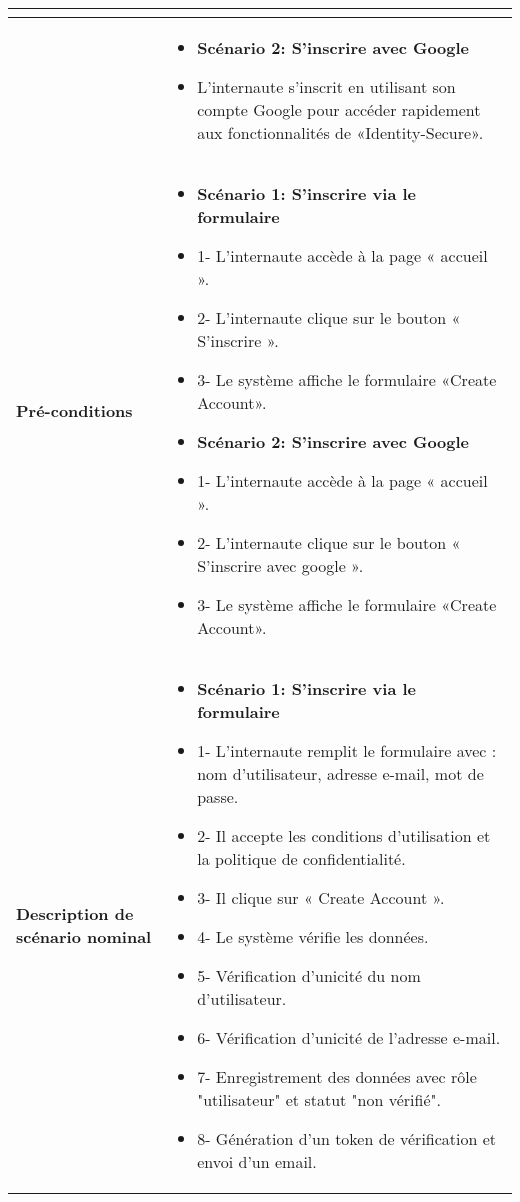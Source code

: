 \begin{longtable}{|>{\arraybackslash}p{4.2cm}|>{\arraybackslash}p{12.5cm}|}
\begin{itemize}[label=]
\end{itemize} \\
\hline
\textbf{} &
\begin{itemize}[label=]
    \item \textbf{Scénario 2: S'inscrire avec Google}
    \item L'internaute s'inscrit en utilisant son compte Google pour accéder rapidement aux fonctionnalités de «Identity-Secure».
\end{itemize}\\
\hline
\textbf{Pré-conditions} &
\begin{itemize}[label=]
    \item \textbf{Scénario 1: S'inscrire via le formulaire}
    \item 1- L'internaute accède à la page « accueil ».
    \item 2- L'internaute clique sur le bouton « S'inscrire ».
    \item 3- Le système affiche le formulaire «Create Account».
    \item \textbf{Scénario 2: S'inscrire avec Google}
    \item 1- L'internaute accède à la page « accueil ».
    \item 2- L'internaute clique sur le bouton « S'inscrire avec google ».
    \item 3- Le système affiche le formulaire «Create Account».
\end{itemize} \\
\hline
\textbf{Description de scénario nominal} &
\begin{itemize}[label=]
    \item \textbf{Scénario 1: S'inscrire via le formulaire}
    \item 1- L'internaute remplit le formulaire avec : nom d'utilisateur, adresse e-mail, mot de passe.
    \item 2- Il accepte les conditions d'utilisation et la politique de confidentialité.
    \item 3- Il clique sur « Create Account ».
    \item 4- Le système vérifie les données.
    \item 5- Vérification d'unicité du nom d'utilisateur.
    \item 6- Vérification d'unicité de l'adresse e-mail.
    \item 7- Enregistrement des données avec rôle "utilisateur" et statut "non vérifié".
    \item 8- Génération d'un token de vérification et envoi d'un email.


\end{itemize}
\end{longtable}

